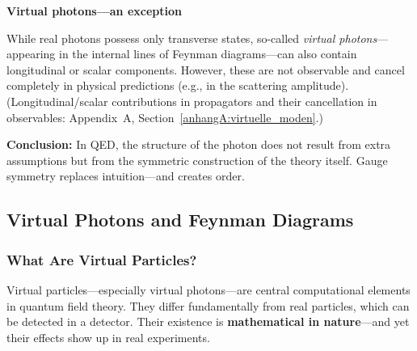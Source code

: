 \textbf{Virtual photons—an exception}

While real photons possess only transverse states, so-called \emph{virtual photons}—appearing in the internal lines of Feynman diagrams—can also contain longitudinal or scalar components.
However, these are not observable and cancel completely in physical predictions (e.g., in the scattering amplitude).
(Longitudinal/scalar contributions in propagators and their cancellation in observables: Appendix~A, Section~\ref{anhangA:virtuelle_moden}.)

\textbf{Conclusion:}
In QED, the structure of the photon does not result from extra assumptions but from the symmetric construction of the theory itself. Gauge symmetry replaces intuition—and creates order.

\subsection{Virtual Photons and Feynman Diagrams}

\subsubsection{What Are Virtual Particles?}

Virtual particles—especially virtual photons—are central computational elements in quantum field theory.
They differ fundamentally from real particles, which can be detected in a detector.
Their existence is \textbf{mathematical in nature}—and yet their effects show up in real experiments.

